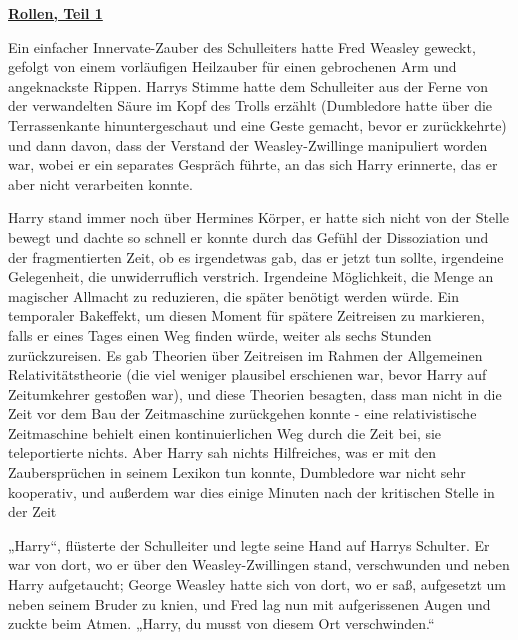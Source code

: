

\hypertarget{rollen-teil-1}{%

\textbf{\uline{Rollen, Teil 1}}

Ein einfacher Innervate-Zauber des Schulleiters hatte Fred Weasley geweckt, gefolgt von einem vorläufigen Heilzauber für einen gebrochenen Arm und angeknackste Rippen. Harrys Stimme hatte dem Schulleiter aus der Ferne von der verwandelten Säure im Kopf des Trolls erzählt (Dumbledore hatte über die Terrassenkante hinuntergeschaut und eine Geste gemacht, bevor er zurückkehrte) und dann davon, dass der Verstand der Weasley-Zwillinge manipuliert worden war, wobei er ein separates Gespräch führte, an das sich Harry erinnerte, das er aber nicht verarbeiten konnte.

Harry stand immer noch über Hermines Körper, er hatte sich nicht von der Stelle bewegt und dachte so schnell er konnte durch das Gefühl der Dissoziation und der fragmentierten Zeit, ob es irgendetwas gab, das er jetzt tun sollte, irgendeine Gelegenheit, die unwiderruflich verstrich. Irgendeine Möglichkeit, die Menge an magischer Allmacht zu reduzieren, die später benötigt werden würde. Ein temporaler Bakeffekt, um diesen Moment für spätere Zeitreisen zu markieren, falls er eines Tages einen Weg finden würde, weiter als sechs Stunden zurückzureisen. Es gab Theorien über Zeitreisen im Rahmen der Allgemeinen Relativitätstheorie (die viel weniger plausibel erschienen war, bevor Harry auf Zeitumkehrer gestoßen war), und diese Theorien besagten, dass man nicht in die Zeit vor dem Bau der Zeitmaschine zurückgehen konnte - eine relativistische Zeitmaschine behielt einen kontinuierlichen Weg durch die Zeit bei, sie teleportierte nichts. Aber Harry sah nichts Hilfreiches, was er mit den Zaubersprüchen in seinem Lexikon tun konnte, Dumbledore war nicht sehr kooperativ, und außerdem war dies einige Minuten nach der kritischen Stelle in der Zeit

„Harry“, flüsterte der Schulleiter und legte seine Hand auf Harrys Schulter. Er war von dort, wo er über den Weasley-Zwillingen stand, verschwunden und neben Harry aufgetaucht; George Weasley hatte sich von dort, wo er saß, aufgesetzt um neben seinem Bruder zu knien, und Fred lag nun mit aufgerissenen Augen und zuckte beim Atmen. „Harry, du musst von diesem Ort verschwinden.“

}
